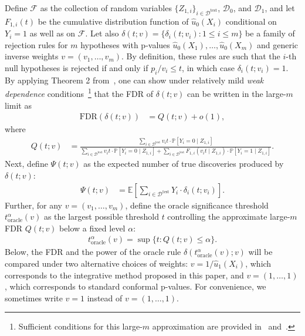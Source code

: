 \documentclass[11pt]{article}
\renewcommand{\P}[1]{\mathbb{P}\left[#1\right]}
\newcommand{\E}[1]{\mathbb{E}\left[#1\right]}
\begin{document}
Define $\mathcal{F}$ as the collection of random variables $\{Z_{1,i}\}_{i\in \mathcal{D}^{\mathrm{test}}}$, $\mathcal{D}_0$, and $\mathcal{D}_1$, and let $F_{1,i}(t)$ be the cumulative distribution function of $\hat{u}_0(X_i)$ conditional on $Y_i=1$ as well as on $\mathcal{F}$.
Let also $\delta(t; v)=\{\delta_i(t; v_i): 1\leq i \leq m\}$ be a family of rejection rules for $m$ hypotheses with p-values $\hat{u}_0(X_1),\ldots,\hat{u}_0(X_m)$ and generic inverse weights $v=(v_1,\ldots,v_m)$. By definition, these rules are such that the $i$-th null hypotheses is rejected if and only if $p_i / v_i \leq t$, in which case $\delta_i(t; v_i)=1$.
By applying Theorem 2 from~\cite{Caietal20}, one can show under relatively mild \emph{weak dependence} conditions~\cite{storey2004strong}\footnote{Sufficient conditions for this large-$m$ approximation are provided in~\cite{basu2018weighted} and~\cite{Caietal20}.} that the FDR of $\delta(t; v)$ can be written in the large-$m$ limit as
\begin{align*}
  \mathrm{FDR}(\delta(t; v))
  & = Q(t; v) + o(1),
\end{align*}
where
\begin{align*}
  Q(t; v)
  & = \frac{\sum_{i \in \mathcal{D}^{\mathrm{test}}} v_i t \cdot \P{Y_i = 0 \mid Z_{1,i}} }{ \sum_{i \in \mathcal{D}^{\mathrm{test}}} v_i t \cdot \P{Y_i = 0 \mid Z_{1,i}} + \sum_{i \in \mathcal{D}^{\mathrm{test}}} F_{1,i}(v_it \mid Z_{1,i}) \cdot \P{Y_i = 1 \mid Z_{1,i}}}.
\end{align*}
Next, define $\Psi(t;v)$ as the expected number of true discoveries produced by $\delta(t; v)$:
\begin{align} \label{eq:true-discoveries}
  \Psi(t;v)
  &= \E{\sum_{i \in \mathcal{D}^{\mathrm{test}}} Y_i \cdot \delta_i(t; v_i) }.
\end{align}
Further, for any $v=(v_1,\ldots,v_m)$, define the oracle significance threshold $t^{\alpha}_{\mathrm{oracle}}(v)$ as the largest possible threshold $t$ controlling the approximate large-$m$ FDR $Q(t; v)$ below a fixed level $\alpha$:
\begin{align*}
  t^{\alpha}_{\mathrm{oracle}}(v) = \sup \{ t: Q(t; v) \leq \alpha\}.
\end{align*}
Below, the FDR and the power of the oracle rule $\delta(t^{\alpha}_{\mathrm{oracle}}(v); v)$ will be compared under two alternative choices of weights: $v = 1/\hat{u}_1(X_i)$, which corresponds to the integrative method proposed in this paper, and $v=(1,\ldots,1)$, which corresponds to standard conformal p-values. For convenience, we sometimes write $v=1$ instead of $v=(1,\ldots,1)$.
\end{document}
